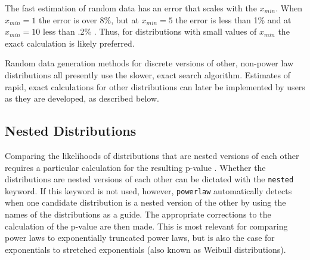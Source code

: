 \documentclass[10pt]{article}
\begin{document}
The fast estimation of random data has an error that scales with the $x_{min}$. When $x_{min}=1$ the error is over 8\%, but at $x_{min}=5$ the error is less than 1\% and at $x_{min}=10$ less than .2\% \cite{Clauset2009}. Thus, for distributions with small values of $x_{min}$ the exact calculation is likely preferred. %
%
%
%
%
%
%

Random data generation methods for discrete versions of other, non-power law distributions all presently use the slower, exact search algorithm. Estimates of rapid, exact calculations for other distributions can later be implemented by users as they are developed, as described below.%

\subsection*{Nested Distributions}
Comparing the likelihoods of distributions that are nested versions of each other requires a particular calculation for the resulting p-value \cite{Clauset2009}. Whether the distributions are nested versions of each other can be dictated with the \verb$nested$ keyword. If this keyword is not used, however, \verb$powerlaw$ automatically detects when one candidate distribution is a nested version of the other by using the names of the distributions as a guide. The appropriate corrections to the calculation of the p-value are then made. This is most relevant for comparing power laws to exponentially truncated power laws, but is also the case for exponentials to stretched exponentials (also known as Weibull distributions). 
\end{document}
